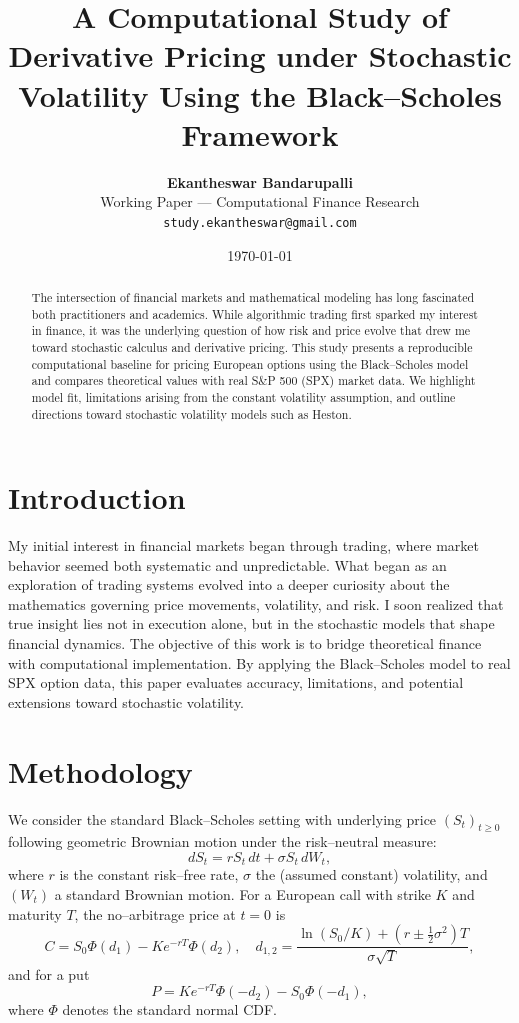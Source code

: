 \documentclass[12pt]{article}
\title{\textbf{A Computational Study of Derivative Pricing under Stochastic Volatility Using the Black--Scholes Framework}}
\author{\textbf{Ekantheswar Bandarupalli}\\
\small Working Paper --- Computational Finance Research\\
\small \texttt{study.ekantheswar@gmail.com}}
\date{\today}
\begin{document}
\maketitle
\thispagestyle{empty}

\begin{abstract}
The intersection of financial markets and mathematical modeling has long fascinated both practitioners and academics.
While algorithmic trading first sparked my interest in finance, it was the underlying question of how risk and price evolve
that drew me toward stochastic calculus and derivative pricing. This study presents a reproducible computational baseline for
pricing European options using the Black--Scholes model and compares theoretical values with real S\&P 500 (SPX) market data.
We highlight model fit, limitations arising from the constant volatility assumption, and outline directions toward stochastic
volatility models such as Heston.
\end{abstract}

\newpage
\setcounter{page}{1}

\section{Introduction}
My initial interest in financial markets began through trading, where market behavior seemed both systematic and unpredictable.
What began as an exploration of trading systems evolved into a deeper curiosity about the mathematics governing price movements,
volatility, and risk. I soon realized that true insight lies not in execution alone, but in the stochastic models that shape
financial dynamics. The objective of this work is to bridge theoretical finance with computational implementation.
By applying the Black--Scholes model to real SPX option data, this paper evaluates accuracy, limitations, and potential extensions
toward stochastic volatility.

\section{Methodology}
We consider the standard Black--Scholes setting with underlying price $(S_t)_{t\ge 0}$ following geometric Brownian motion under the
risk--neutral measure:
\begin{equation}
dS_t = r S_t\,dt + \sigma S_t\, dW_t,
\end{equation}
where $r$ is the constant risk--free rate, $\sigma$ the (assumed constant) volatility, and $(W_t)$ a standard Brownian motion.
For a European call with strike $K$ and maturity $T$, the no--arbitrage price at $t=0$ is
\begin{equation}
C = S_0 \Phi(d_1) - K e^{-rT} \Phi(d_2), \quad
d_{1,2} = \frac{\ln(S_0/K) + (r \pm \tfrac{1}{2}\sigma^2)T}{\sigma\sqrt{T}},
\end{equation}
and for a put
\begin{equation}
P = K e^{-rT} \Phi(-d_2) - S_0 \Phi(-d_1),
\end{equation}
where $\Phi$ denotes the standard normal CDF.
\end{document}
